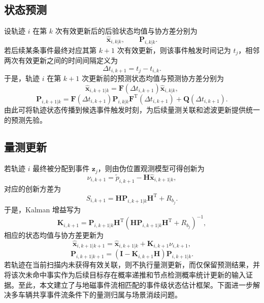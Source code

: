 \documentclass{xdupgthesis}
\begin{document}
\subsection{状态预测}

设轨迹 $i$ 在第 $k$ 次有效更新后的后验状态均值与协方差分别为
\begin{equation}
	\hat{\mathbf x}_{i,k|k},
	\qquad
	\mathbf P_{i,k|k}.
	\label{eq:ch3_post_state}
\end{equation}
若后续某条事件最终对应其第 $k+1$ 次有效更新，则该事件触发时间记为 $t_j$，相邻两次有效更新之间的时间间隔定义为
\begin{equation}
	\Delta t_{i,k+1}=t_j-t_{i,k}.
	\label{eq:ch3_dt_update}
\end{equation}
于是，轨迹 $i$ 在第 $k+1$ 次更新前的预测状态均值与预测协方差分别为
\begin{equation}
	\hat{\mathbf x}_{i,k+1|k}
	=
	\mathbf F\left(\Delta t_{i,k+1}\right)\hat{\mathbf x}_{i,k|k},
	\label{eq:ch3_predict_state}
\end{equation}
\begin{equation}
	\mathbf P_{i,k+1|k}
	=
	\mathbf F\left(\Delta t_{i,k+1}\right)
	\mathbf P_{i,k|k}
	\mathbf F^{\mathrm T}\left(\Delta t_{i,k+1}\right)
	+
	\mathbf Q\left(\Delta t_{i,k+1}\right).
	\label{eq:ch3_predict_cov}
\end{equation}
由此可将轨迹状态传播到候选事件触发时刻，为后续量测关联和滤波更新提供统一的预测先验。

\subsection{量测更新}

若轨迹 $i$ 最终被分配到事件 $\mathbf z_j$，则由伪位置观测模型可得创新为
\begin{equation}
	\nu_{i,k+1}=\tilde p_{i,k+1}-\mathbf H\hat{\mathbf x}_{i,k+1|k},
	\label{eq:ch3_innovation_event}
\end{equation}
对应的创新方差为
\begin{equation}
	S_{i,k+1}=\mathbf H\mathbf P_{i,k+1|k}\mathbf H^{\mathrm T}+R_{b_j}.
	\label{eq:ch3_S_event}
\end{equation}
于是，Kalman 增益写为
\begin{equation}
	\mathbf K_{i,k+1}
	=
	\mathbf P_{i,k+1|k}\mathbf H^{\mathrm T}
	\left(
	\mathbf H\mathbf P_{i,k+1|k}\mathbf H^{\mathrm T}+R_{b_j}
	\right)^{-1},
	\label{eq:ch3_K_event}
\end{equation}
相应的状态均值与协方差更新为
\begin{equation}
	\hat{\mathbf x}_{i,k+1|k+1}
	=
	\hat{\mathbf x}_{i,k+1|k}
	+
	\mathbf K_{i,k+1}\nu_{i,k+1},
	\label{eq:ch3_update_state_event}
\end{equation}
\begin{equation}
	\mathbf P_{i,k+1|k+1}
	=
	\left(\mathbf I-\mathbf K_{i,k+1}\mathbf H\right)\mathbf P_{i,k+1|k}.
	\label{eq:ch3_update_cov_event}
\end{equation}
若轨迹在当前扫描内未获得有效关联，则不执行量测更新，而仅保留预测结果，并将该次未命中事实作为后续目标存在概率递推和节点检测概率统计更新的输入证据。至此，本文建立了与地磁事件流相匹配的事件级状态估计框架。下面进一步解决多车辆共享事件流条件下的量测归属与场景消歧问题。
\end{document}
